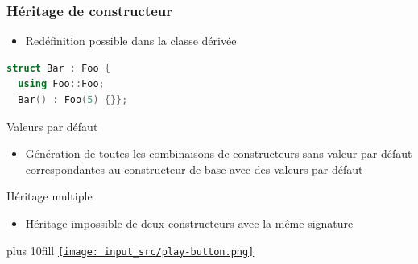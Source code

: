 \documentclass[C++.tex]{subfiles}
\begin{document}
\begin{frame}[fragile]
	\frametitle{Héritage de constructeur}
	\begin{itemize}
		\item Redéfinition possible dans la classe dérivée
	\end{itemize}

	\begin{lstlisting}[language=C++]
struct Bar : Foo {
  using Foo::Foo;
  Bar() : Foo(5) {}};\end{lstlisting}

	\begin{alertblock}{Valeurs par défaut}
		\begin{itemize}
			\item Génération de toutes les combinaisons de constructeurs sans valeur par défaut correspondantes au constructeur de base avec des valeurs par défaut
		\end{itemize}

	\end{alertblock}

	\begin{alertblock}{Héritage multiple}
		\begin{itemize}
			\item Héritage impossible de deux constructeurs avec la même signature
		\end{itemize}
	\end{alertblock}


	\vskip 10mm plus 10fill
	\hfill
	\href{https://godbolt.org/#z:OYLghAFBqd5QCxAYwPYBMCmBRdBLAF1QCcAaPECAMzwBtMA7AQwFtMQByARg9KtQYEAysib0QXACx8BBAKoBnTAAUAHpwAMvAFYTStJg1DIApACYAQuYukl9ZATwDKjdAGFUtAK4sGe1wAyeAyYAHI%2BAEaYxCAAbGakAA6oCoRODB7evnrJqY4CQSHhLFEx8baY9vkMQgRMxASZPn5cFVXptfUEhWGR0XEJCnUNTdmtQ109xaUDAJS2qF7EyOwc5gDMwcjeWADUJutuTkPEmKwH2CYaAIIbWzuY%2B4cnwcAXV7c3J14OuwBiqFQHxMAHYrDddv9ARBggRdkxZh9IZCQLsWAB9JgQBFI/Zg3GggAiwIhUNQEDQDCGuyG6BAIBeRnMsRpBGIiNJKLRmIgtPpQ1QeF5bNmHOukNB4PFeOJN1xsO5TAOUqJypJ12%2Bvws9V2qIBQLl%2BNJXlSRjJ9P1arlhuJ6xVXzZPzh2oAXrqycCjdKTa9zSBLXb1ZDXRSBNS%2BQy2a9maz2biufqIBoxcjdqRuSdhXHSZKCSDZZ9C5CI4zgBm2VbbvnKx8FSwmMEIGLczmvan9bt%2BOTJIjA5yybsIvUIOYzJIzKPe/bpcWCHSUIs4Qc3MvO4CAHQYphPFeHXZgDj7w/L1dD4ibzE71cHkwAVjcDBvfelqutL7byO1xDX3an8d2X6DsOo7jpONb9hGaBeEuhyrl2F7biee4HkeV57meCFoW4R53g%2BT5ShK1ZvoRBGfkwbpdhAPaVqmrpAcQI5mGOE5MX%2BxHIpBi5YT%2BmFIdhKEoXx9G8bByGHk%2Bu7YRhGInFhN73o%2BazPoRBavtcHDzLQnC3rwfgcFopCoJwK6WNYNKLMsjwbDwpAEJoGnzAA1iAt4aPonCSLp9mGZwvAKCAbl2fpGmkHAsBIJgqiYMg0EkOQlD1MACjKIYlRCAgqAAO56TZaAsIkdBMNUKUhLQ6VZXpBl5QV9AxMAXBcAk1V0NEADy0Hldl3mRdF1zEElvmkD1yC1Pgem8PwggiGI7BSDIgiKCo6jBaQuitAYRgoNY1j6HgET%2BbAzBsCAESAkMpAAG79NwII6aKhmJNU/kcAAtLSByEqYpmWA1fkWSsei0sEJVpRlXXcLwbKYKsNmZcQTCJPZmnaV5K1GRw2BRTFRDfqoAAcsQvbEki7MAyDILsDXrmYuwQCZViWOmuCECQ%2BxmOsXCzJDSPzAgZxYDETakM5rnuRwnmkJVvDo35AW2TzYtmKjBky/LwX3VdxCpM4khAA}{\texttt{[image: input\_src/play-button.png]}}
\end{frame}
\end{document}
